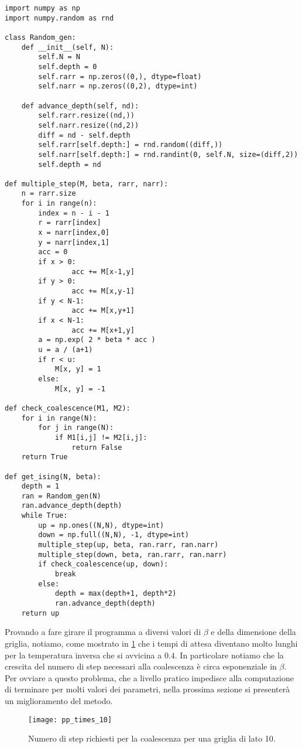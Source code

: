\documentclass[]{marticle}
\begin{document}
\begin{lstlisting}
import numpy as np
import numpy.random as rnd

class Random_gen:
    def __init__(self, N):
        self.N = N
        self.depth = 0
        self.rarr = np.zeros((0,), dtype=float)
        self.narr = np.zeros((0,2), dtype=int)

    def advance_depth(self, nd):
        self.rarr.resize((nd,))
        self.narr.resize((nd,2))
        diff = nd - self.depth
        self.rarr[self.depth:] = rnd.random((diff,))
        self.narr[self.depth:] = rnd.randint(0, self.N, size=(diff,2))
        self.depth = nd

def multiple_step(M, beta, rarr, narr):
    n = rarr.size
    for i in range(n):
        index = n - i - 1
        r = rarr[index]
        x = narr[index,0]
        y = narr[index,1]
        acc = 0
        if x > 0:
                acc += M[x-1,y]
        if y > 0:
                acc += M[x,y-1]
        if y < N-1:
                acc += M[x,y+1]
        if x < N-1:
                acc += M[x+1,y]
        a = np.exp( 2 * beta * acc )
        u = a / (a+1)
        if r < u:
            M[x, y] = 1
        else:
            M[x, y] = -1

def check_coalescence(M1, M2):
    for i in range(N):
        for j in range(N):
            if M1[i,j] != M2[i,j]:
                return False
    return True

def get_ising(N, beta):
    depth = 1
    ran = Random_gen(N)
    ran.advance_depth(depth)
    while True:
        up = np.ones((N,N), dtype=int)
        down = np.full((N,N), -1, dtype=int)
        multiple_step(up, beta, ran.rarr, ran.narr)
        multiple_step(down, beta, ran.rarr, ran.narr)
        if check_coalescence(up, down):
            break
        else:
            depth = max(depth+1, depth*2)
            ran.advance_depth(depth)
    return up
\end{lstlisting}

Provando a fare girare il programma a diversi valori di $\beta$ e della
dimensione della griglia, notiamo, come mostrato in \ref{fig:plot1} che i tempi
di attesa diventano molto lunghi per la temperatura inversa che si avvicina a
$0.4$. In particolare notiamo che la crescita del numero di step necessari alla
coalescenza \`e circa esponenziale in $\beta$. Per ovviare a questo problema,
che a livello pratico impedisce alla computazione di terminare per molti valori
dei parametri, nella prossima sezione si presenter\`a un miglioramento del
metodo.
\begin{figure}[h!]
\caption{Numero di step richiesti per la coalescenza per una griglia di lato 10.}
\texttt{[image: pp\_times\_10]}
\label{fig:plot1}
\centering
\end{figure}
\end{document}

